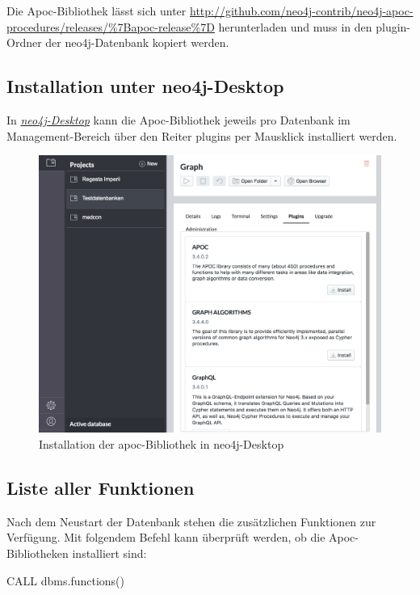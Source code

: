 \documentclass[ngerman,]{scrreprt}
\begin{document}
Die Apoc-Bibliothek lässt sich unter \url{http://github.com/neo4j-contrib/neo4j-apoc-procedures/releases/\%7Bapoc-release\%7D} herunterladen und muss in den plugin-Ordner der neo4j-Datenbank kopiert werden.

\subsection{Installation unter neo4j-Desktop}\label{installation-unter-neo4j-desktop}

In \href{https://neo4j.com/download/}{\emph{neo4j-Desktop}} kann die Apoc-Bibliothek jeweils pro Datenbank im Management-Bereich über den Reiter plugins per Mausklick installiert werden.

\begin{figure}
\centering
\includegraphics{Bilder/cypherFortgeschrittene/neo4j-Desktop-install-apoc.png}
\caption{Installation der apoc-Bibliothek in neo4j-Desktop}
\end{figure}

\subsection{Liste aller Funktionen}\label{liste-aller-funktionen}

Nach dem Neustart der Datenbank stehen die zusätzlichen Funktionen zur Verfügung. Mit folgendem Befehl kann überprüft werden, ob die Apoc-Bibliotheken installiert sind:

CALL dbms.functions()
\end{document}
